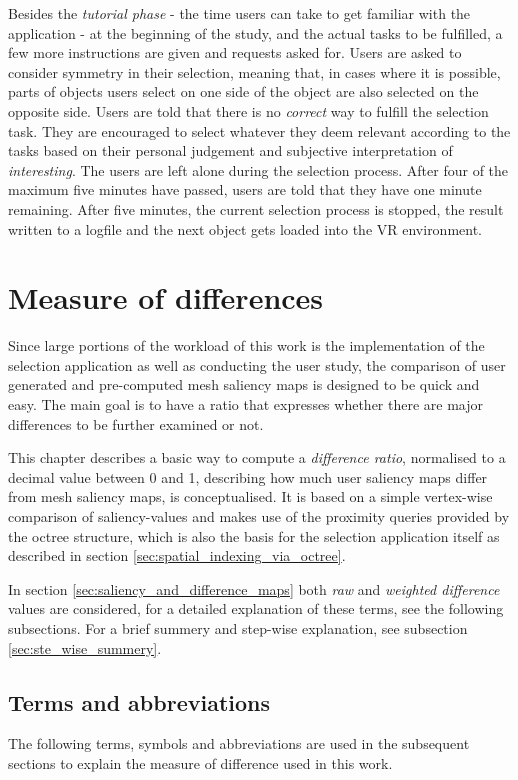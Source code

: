 Besides the \textit{tutorial phase} - the time users can take to get familiar with the application - at the beginning of the study, and the actual tasks to be fulfilled, a few more instructions are given and requests asked for. Users are asked to consider symmetry in their selection, meaning that, in cases where it is possible, parts of objects users select on one side of the object are also selected on the opposite side. Users are told that there is no \textit{correct} way to fulfill the selection task. They are encouraged to select whatever they deem relevant according to the tasks based on their personal judgement and subjective interpretation of \textit{interesting}. The users are left alone during the selection process. After four of the maximum five minutes have passed, users are told that they have one minute remaining. After five minutes, the current selection process is stopped, the result written to a logfile and the next object gets loaded into the VR environment. 


	\section {Measure of differences}
	\label{sec:measure_of_difference}
Since large portions of the workload of this work is the implementation of the selection application as well as conducting the user study, the comparison of user generated and pre-computed mesh saliency maps is designed to be quick and easy. The main goal is to have a ratio that expresses whether there are major differences to be further examined or not.

This chapter describes a basic way to compute a \textit{difference ratio}, normalised to a decimal value between 0 and 1, describing how much user saliency maps differ from mesh saliency maps, is conceptualised. It is based on a simple vertex-wise comparison of saliency-values and makes use of the proximity queries provided by the octree structure, which is also the basis for the selection application itself as described in section \ref{sec:spatial_indexing_via_octree}.

In section \ref{sec:saliency_and_difference_maps} both \textit{raw} and \textit{weighted difference} values are considered, for a detailed explanation of these terms, see the following subsections. For a brief summery and step-wise explanation, see subsection \ref{sec:ste_wise_summery}.

		\subsection{Terms and abbreviations}
		\label{sec:concept_terms_and_abbreviations}
The following terms, symbols and abbreviations are used in the subsequent sections to explain the measure of difference used in this work.

